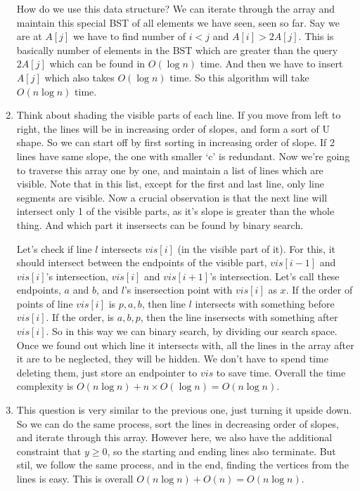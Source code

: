 \documentclass[12pt]{report}
\begin{document}
\begin{enumerate}[label=\textbf{\arabic*.}]
  How do we use this data structure? We can iterate through the array and maintain this special BST of all elements we have seen, 
  seen so far. Say we are at $A[j]$ we have to find number of $i < j$ and $A[i] > 2A[j]$. This is basically number of elements in the 
  BST which are greater than the query $2A[j]$ which can be found in $O(\log n)$ time. And then we have to insert $A[j]$ which also takes
  $O(\log n)$ time.
  So this algorithm will take $O(n \log n)$ time.

  \item Think about shading the visible parts of each line. If you move from left to right, the lines will be in increasing order of slopes,
  and form a sort of U shape. So we can start off by first sorting in increasing order of slope. If 2 lines have same slope, the one with 
  smaller `c' is redundant. Now we're going to traverse this array one by one, and maintain a list of lines which are visible. Note that in 
  this list, except for the first and last line, only line segments are visible. Now a crucial observation is that the next line will intersect
  only 1 of the visible parts, as it's slope is greater than the whole thing. And which part it insersects can be found by binary search. 
  
  Let's check if line $l$ intersects $vis[i]$ (in the visible part of it). For this, it should intersect between the endpoints of the visible
  part, $vis[i-1]$ and $vis[i]$'s intersection, $vis[i]$ and $vis[i+1]$'s intersection. Let's call these endpoints, $a$ and $b$, and $l$'s
  insersection point with $vis[i]$ as $x$. If the order of points of line $vis[i]$ is $p, a, b$, then line $l$ intersects with something 
  before $vis[i]$. If the order, is $a, b, p$, then the line insersects with something after $vis[i]$. So in this way we can binary search, 
  by dividing our search space. Once we found out which line it intersects with, all the lines in the array after it are to be neglected, they
  will be hidden. We don't have to spend time deleting them, just store an endpointer to $vis$ to save time. Overall the time complexity is 
  $O(n \log n) + n \times O(\log n) = O(n \log n)$.

  \item This question is very similar to the previous one, just turning it upside down. So we can do the same process, sort the lines in decreasing
  order of slopes, and iterate through this array. However here, we also have the additional constraint that $y \geq 0$, so the starting and ending
  lines also terminate. But stil, we follow the same process, and in the end, finding the vertices from the lines is easy. This is overall
  $O(n \log n) + O(n) = O(n \log n)$.


\end{enumerate}
\end{document}

